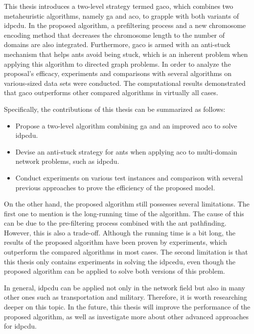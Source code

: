 This thesis introduces a two-level strategy termed \acrshort{gaco}, which combines two metaheuristic algorithms, namely \gls{ga} and \gls{aco}, to grapple with both variants of \gls{idpcdu}. In the proposed algorithm, a prefiltering process and a new chromosome encoding method that decreases the chromosome length to the number of domains are also integrated. Furthermore, \acrshort{gaco} is armed with an anti-stuck mechanism that helps ants avoid being stuck, which is an inherent problem when applying this algorithm to directed graph problems. In order to analyze the proposal’s efficacy, experiments and comparisons with several algorithms on various-sized data sets were conducted. The computational results demonstrated that \acrshort{gaco} outperforms other compared algorithms in virtually all cases.

Specifically, the contributions of this thesis can be summarized as follows:
\begin{itemize}
	\item Propose a two-level algorithm combining \gls{ga} and an improved \gls{aco} to solve \gls{idpcdu}.
	\item Devise an anti-stuck strategy for ants when applying \gls{aco} to multi-domain network problems, such as \gls{idpcdu}.
	\item Conduct experiments on various test instances and comparison with several previous approaches to prove the efficiency of the proposed model.
\end{itemize}

On the other hand, the proposed algorithm still possesses several limitations. The first one to mention is the long-running time of the algorithm. The cause of this can be due to the pre-filtering process combined with the ant pathfinding. However, this is also a trade-off. Although the running time is a bit long, the results of the proposed algorithm have been proven by experiments, which outperform the compared algorithms in most cases. The second limitation is that this thesis only contains experiments in solving the \gls{idpcedu}, even though the proposed algorithm can be applied to solve both versions of this problem.

In general, \gls{idpcdu} can be applied not only in the network field but also in many other ones such as transportation and military. Therefore, it is worth researching deeper on this topic. In the future, this thesis will improve the performance of the proposed algorithm, as well as investigate more about other advanced approaches for \gls{idpcdu}.

